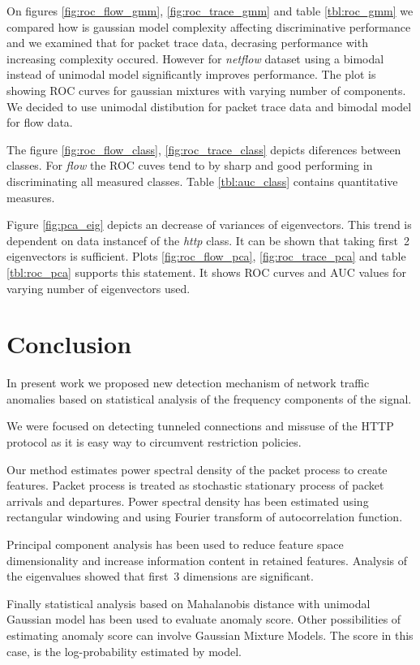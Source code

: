 On figures \ref{fig:roc_flow_gmm}, \ref{fig:roc_trace_gmm} and table \ref{tbl:roc_gmm}
we compared how is gaussian model complexity affecting discriminative performance and we 
examined that for packet trace data, decrasing performance with increasing complexity occured.
However for \emph{netflow} dataset using a bimodal instead of unimodal model significantly improves performance. 
The plot is showing ROC curves for gaussian mixtures with varying number of components.
We decided to use unimodal distibution for packet trace data and bimodal model for flow data.

The figure \ref{fig:roc_flow_class}, \ref{fig:roc_trace_class} depicts diferences between classes. For \emph{flow} the ROC
cuves tend to by sharp and good performing in discriminating all measured classes.
Table \ref{tbl:auc_class} contains quantitative measures.

Figure \ref{fig:pca_eig} depicts an decrease of variances of eigenvectors. This trend is dependent on
data instancef of the \emph{http} class. It can be shown that taking first~2 eigenvectors is sufficient.
Plots \ref{fig:roc_flow_pca}, \ref{fig:roc_trace_pca} and table \ref{tbl:roc_pca} supports this statement. It shows
ROC curves and AUC values for varying number of eigenvectors used.


\section{Conclusion}

In present work we proposed new detection mechanism of network traffic anomalies
based on statistical analysis of the frequency components of the signal.

We were focused on detecting tunneled connections and missuse of the HTTP protocol as it is easy way to
circumvent restriction policies.


Our method estimates power spectral density of the packet process to create features.
Packet process is treated as stochastic stationary process of packet arrivals and departures.
Power spectral density has been estimated using rectangular windowing and using Fourier transform of
autocorrelation function.

Principal component analysis has been used to reduce feature space dimensionality and increase
information content in retained features.
Analysis of the eigenvalues showed that first~3 dimensions are significant. 

Finally statistical analysis based on  Mahalanobis distance with
unimodal Gaussian model has been used  to evaluate anomaly score.
Other possibilities of estimating anomaly score can involve Gaussian Mixture Models.
The score in this case, is the log-probability estimated by model.

